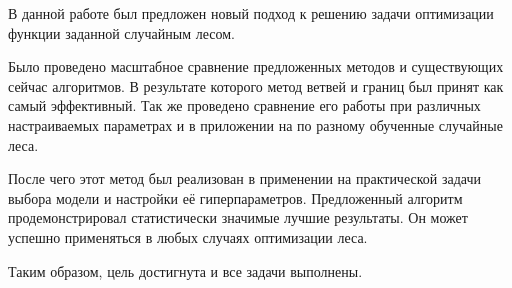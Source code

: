 \documentclass[pscyr]{itmo-student-thesis}
\begin{document}
\startconclusionpage{}
В данной работе был предложен новый подход к решению задачи оптимизации функции
заданной случайным лесом.

Было проведено масштабное сравнение предложенных методов и существующих сейчас
алгоритмов. В результате которого метод ветвей и границ был принят как самый
эффективный. Так же проведено сравнение его работы при различных настраиваемых
параметрах и в приложении на по разному обученные случайные леса.

После чего этот метод был реализован в применении на практической задачи выбора
модели и настройки её гиперпараметров. Предложенный алгоритм продемонстрировал
статистически значимые лучшие результаты. Он может успешно применяться в любых
случаях оптимизации леса.

Таким образом, цель достигнута и все задачи выполнены.

\printmainbibliography%
\end{document}
